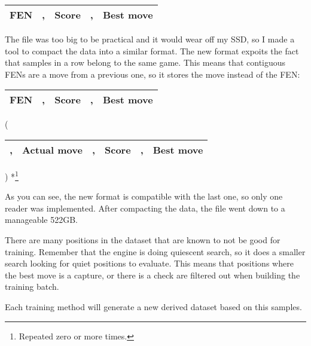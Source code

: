 \begin{center}
\begin{tabular}{|cp{0.0005cm}cp{0.0005cm}c|}
\hline
\textbf{FEN\footnotemark} & , & \textbf{Score} & , & \textbf{Best move} \\
\hline
\end{tabular}
\end{center}


The file was too big to be practical and it would wear off my SSD, so I made a tool to compact the data into a similar format. The new format expoits the fact that samples in a row belong to the same game. This means that contiguous FENs are a move from a previous one, so it stores the move instead of the FEN:

\begin{center}
\begin{tabular}{|cp{0.0005cm}cp{0.0005cm}c|}
\hline
\textbf{FEN} & , & \textbf{Score} & , & \textbf{Best move} \\
\hline
\end{tabular}
(
\begin{tabular}{|p{0.0005cm}cp{0.0005cm}cp{0.0005cm}c|}
\hline
, & \textbf{Actual move} & , & \textbf{Score} & , & \textbf{Best move} \\
\hline
\end{tabular}
) *\footnote{Repeated zero or more times.}
\end{center}

As you can see, the new format is compatible with the last one, so only one reader was implemented. After compacting the data, the file went down to a manageable 522GB.

There are many positions in the dataset that are known to not be good for training. Remember that the engine is doing quiescent search, so it does a smaller search looking for quiet positions to evaluate. This means that positions where the best move is a capture, or there is a check are filtered out when building the training batch.

Each training method will generate a new derived dataset based on this samples.


